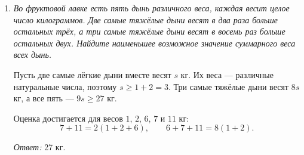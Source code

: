 \begin{enumerate}
\item \textit{Во фруктовой лавке есть пять дынь
различного веса, каждая весит целое
число килограммов. Две самые тяжёлые
дыни весят в два раза больше остальных
трёх, а три самые тяжёлые дыни весят в
восемь раз больше остальных двух.
Найдите наименьшее возможное
значение суммарного веса всех дынь.}

Пусть две самые лёгкие дыни вместе весят $s$ кг. Их веса --- различные
натуральные числа, поэтому $s\geqslant1+2=3$. Три самые тяжёлые дыни весят
$8s$ кг, а все пять --- $9s\geqslant27$ кг.

Оценка достигается для весов $1$, $2$, $6$, $7$ и $11$ кг:
\[
7+11=2(1+2+6), \qquad 6+7+11=8(1+2).
\]

\textit{Ответ: } 27 кг.
\end{enumerate}
